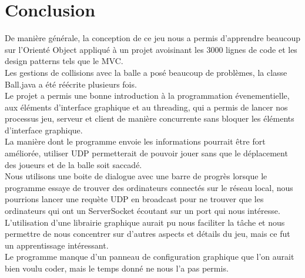 \chapter{Conclusion}

De manière générale, la conception de ce jeu nous a permis d'apprendre beaucoup sur l'Orienté Object appliqué à un projet avoisinant les 3000 lignes de code et les design patterns tels que le MVC.\\

Les gestions de collisions avec la balle a posé beaucoup de problèmes, la classe Ball.java a été réécrite plusieurs fois.\\ 

Le projet a permis une bonne introduction à la programmation évenementielle, aux éléments d'interface graphique et au threading, qui a permis de lancer nos processus jeu, serveur et client de manière concurrente sans bloquer les éléments d'interface graphique.\\

La manière dont le programme envoie les informations pourrait être fort améliorée, utiliser UDP permetterait de pouvoir jouer sans que le déplacement des joueurs et de la balle soit saccadé.\\

Nous utilisons une boite de dialogue avec une barre de progrès lorsque le programme essaye de trouver des ordinateurs connectés sur le réseau local, nous pourrions lancer une requète UDP en broadcast pour ne trouver que les ordinateurs qui ont un ServerSocket écoutant sur un port qui nous intéresse.\\

L'utilisation d'une librairie graphique aurait pu nous faciliter la tâche et nous permettre de nous concentrer sur d'autres aspects et détails du jeu, mais ce fut un apprentissage intéressant.\\

Le programme manque d'un panneau de configuration graphique que l'on aurait bien voulu coder, mais le temps donné ne nous l'a pas permis.\\
